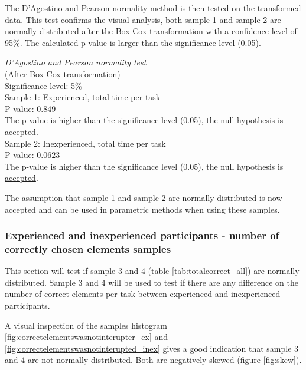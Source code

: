 The D'Agostino and Pearson normality method is then tested on the transformed data. This test confirms the visual analysis, both sample 1 and sample 2 are normally distributed after the Box-Cox transformation with a confidence level of 95\%. The calculated p-value is larger than the significance level (0.05). \\[0.5cm] 

\begin{center}
	\begin{tcolorbox}[width=0.8\textwidth]
		\centering
		\textit{D'Agostino and Pearson normality test}\\
		(After Box-Cox transformation) \\
		Significance level: 5\%  \\[0.5cm]
		
		Sample 1: Experienced, total time per task\\
		P-value: $0.849$\\
		The p-value is higher than the significance level (0.05), the null hypothesis is \underline{accepted}. \\[0.5cm]
		
		Sample 2: Inexperienced, total time per task \\ %
		P-value: $0.0623$ \\
		The p-value is higher than the significance level (0.05), the null hypothesis is \underline{accepted}. \\[0.5cm]
	\end{tcolorbox}
\end{center}

The assumption that sample 1 and sample 2 are normally distributed is now accepted and can be used in parametric methods when using these samples.

\subsubsection[Sample 3 and 4]{Experienced and inexperienced participants - number of correctly chosen elements samples}\label{sec:correct_ex_inex}
This section will test if sample 3 and 4 (table \ref{tab:totalcorrect_all}) are normally distributed. Sample 3 and 4 will be used to test if there are any difference on the number of correct elements per task between experienced and inexperienced participants. 

A visual inspection of the samples histogram \ref{fig:correctelementswasnotinterupter_ex} and \ref{fig:correctelementswasnotinterupted_inex} gives a good indication that sample 3 and 4 are not normally distributed. Both are negatively skewed (figure \ref{fig:skew}).   

